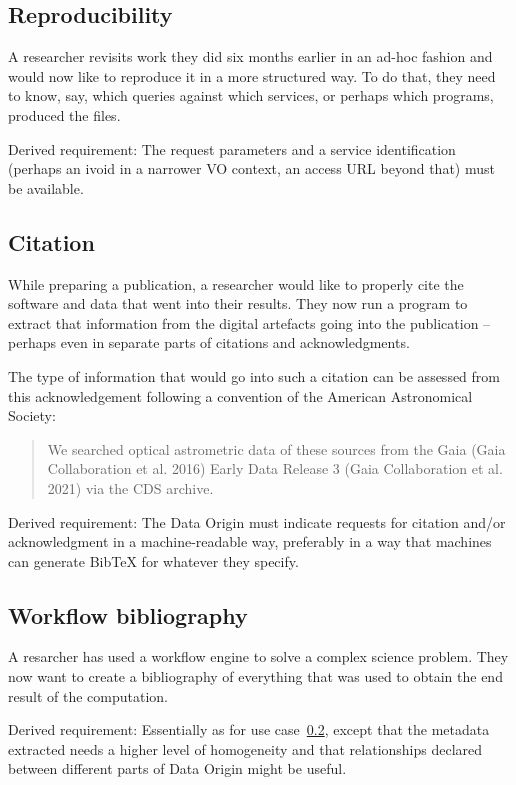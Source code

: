 \documentclass[11pt,a4paper]{ivoa}
\begin{document}
\subsection{Reproducibility}

A researcher revisits work they did six months earlier in an ad-hoc fashion and would now like to reproduce it in a more structured way. To do that, they need to know, say, which queries against which services, or perhaps which programs, produced the files.

Derived requirement: The request parameters and a service identification
(perhaps an ivoid in a narrower VO context, an access URL beyond that) must be available.

\subsection{Citation}
\label{sec:req-citation}

While preparing a publication, a researcher would like to properly cite the software and data that went into their results. They now run a program to extract that information from the digital artefacts going into the publication -- perhaps even in separate parts of citations and acknowledgments.

The type of information that would go into such a
citation can be assessed from this acknowledgement following a
convention of the American Astronomical Society:

\begin{quotation}
We searched optical astrometric data of these sources from the Gaia (Gaia Collaboration et al. 2016) Early Data Release 3 (Gaia Collaboration et al. 2021) via the CDS archive.
\end{quotation}

Derived requirement: The Data Origin must indicate requests for citation
and/or acknowledgment in a machine-readable way, preferably in a way
that machines can generate BibTeX for whatever they specify.


\subsection{Workflow bibliography}

A resarcher has used a workflow engine to solve a complex science
problem.  They now want to create a bibliography of everything that was
used to obtain the end result of the computation.

Derived requirement: Essentially as for use case~\ref{sec:req-citation},
except that the metadata extracted needs a higher level of homogeneity
and that relationships declared between different parts of Data Origin
might be useful.
\end{document}
